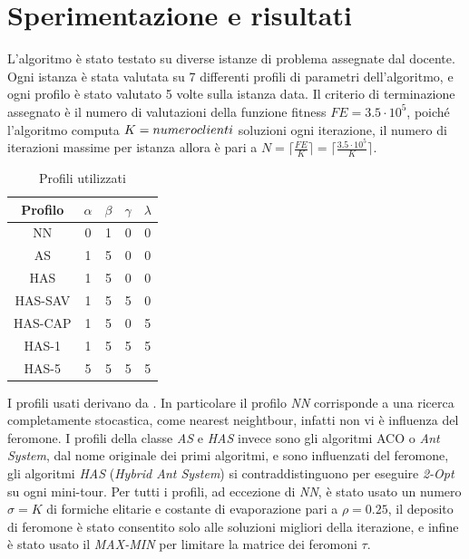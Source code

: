 \documentclass[11pt,a4paper]{article}
\begin{document}
\section{Sperimentazione e risultati}
L'algoritmo è stato testato su diverse istanze di problema assegnate dal docente. Ogni istanza è stata valutata su 7 differenti profili di parametri dell'algoritmo, e ogni profilo è stato valutato 5 volte sulla istanza data. Il criterio di terminazione assegnato è il numero di valutazioni della funzione fitness \(FE=3.5\cdot10^{5}\), poiché l'algoritmo computa \(K = numero\space clienti\) soluzioni ogni iterazione, il numero di iterazioni massime per istanza allora è pari a \(N = \lceil\frac{FE}{K}\rceil = \lceil\frac{3.5\cdot10^5}{K}\rceil \).

\begin{table}[h]
    \centering


    \begin{tabular}{|c||c|c|c|c|}\hline
  \textbf{Profilo} & \textbf{$\alpha$} & \textbf{$\beta$} & \textbf{$\gamma$} & \textbf{$\lambda$} \\\hline
          NN&  0&  1&  0&   0\\\hline
          AS&  1&  5&  0&   0\\\hline
          HAS&  1&  5&  0&   0\\\hline
          HAS-SAV&  1&  5&  5&   0\\\hline
          HAS-CAP&  1&  5&  0&   5\\\hline
          HAS-1&  1&  5&  5&   5\\ \hline
          HAS-5&  5&  5&  5&   5\\ \hline
    \end{tabular}
\caption{Profili utilizzati}
\label{tab:profiles}
    
    
\end{table}

\noindent
I profili usati derivano da \cite{Bullnheimer}. In particolare il profilo \textit{NN} corrisponde a una ricerca completamente stocastica, come nearest neightbour, infatti non vi è influenza del feromone. I profili della classe \textit{AS} e \textit{HAS} invece sono gli algoritmi ACO o \textit{Ant System}, dal nome originale dei primi algoritmi, e sono influenzati del feromone, gli algoritmi \textit{HAS} (\textit{Hybrid Ant System}) si contraddistinguono per eseguire \textit{2-Opt} su ogni mini-tour. Per tutti i profili, ad eccezione di \textit{NN}, è stato usato un numero \(\sigma=K\) di formiche elitarie e costante di evaporazione pari a \(\rho=0.25\), il deposito di feromone è stato consentito solo alle soluzioni migliori della iterazione, e infine è stato usato il \textit{MAX-MIN} per limitare la matrice dei feromoni \(\tau\).
\end{document}
